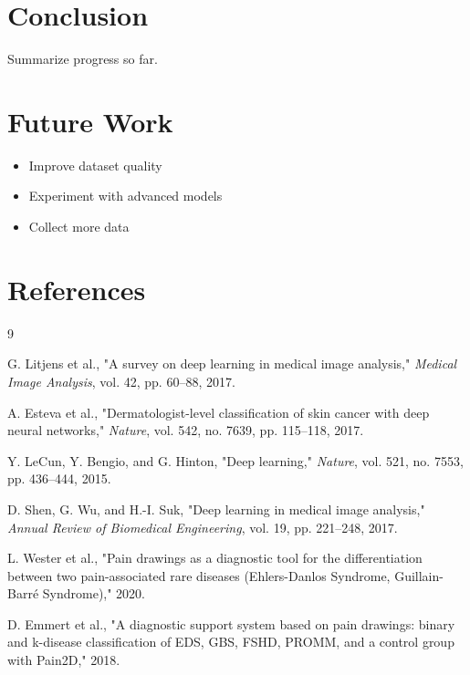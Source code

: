 \documentclass[12pt]{report}
\begin{document}
\chapter{Conclusion}
Summarize progress so far.

\chapter{Future Work}
\begin{itemize}
    \item Improve dataset quality
    \item Experiment with advanced models
    \item Collect more data
\end{itemize}

\chapter{References}



\begin{thebibliography}{9}
	
	G. Litjens et al., "A survey on deep learning in medical image analysis," \textit{Medical Image Analysis}, vol. 42, pp. 60–88, 2017.
	
	A. Esteva et al., "Dermatologist-level classification of skin cancer with deep neural networks," \textit{Nature}, vol. 542, no. 7639, pp. 115–118, 2017.
	
	Y. LeCun, Y. Bengio, and G. Hinton, "Deep learning," \textit{Nature}, vol. 521, no. 7553, pp. 436–444, 2015.
	
	D. Shen, G. Wu, and H.-I. Suk, "Deep learning in medical image analysis," \textit{Annual Review of Biomedical Engineering}, vol. 19, pp. 221–248, 2017.
	
	L. Wester et al., "Pain drawings as a diagnostic tool for the differentiation between two pain-associated rare diseases (Ehlers-Danlos Syndrome, Guillain-Barré Syndrome)," 2020.
	
	D. Emmert et al., "A diagnostic support system based on pain drawings: binary and k-disease classification of EDS, GBS, FSHD, PROMM, and a control group with Pain2D," 2018.
	
\end{thebibliography}
\end{document}
